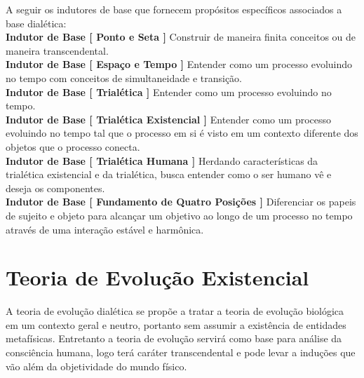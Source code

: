 \documentclass[10pt,a4paper]{report}
\begin{document}
A seguir os indutores de base que fornecem propósitos específicos associados a base dialética:\\

\textbf{Indutor de Base [ Ponto e Seta ]} Construir de maneira finita conceitos ou de maneira transcendental. \\

\textbf{Indutor de Base [ Espaço e Tempo ]} Entender como um processo evoluindo no tempo com conceitos de simultaneidade e transição.\\

\textbf{Indutor de Base [ Trialética ]} Entender como um processo evoluindo no tempo.\\

\textbf{Indutor de Base [ Trialética Existencial ]} Entender como um processo evoluindo no tempo tal que o processo em si é visto em um contexto diferente dos objetos que o processo conecta.\\

\textbf{Indutor de Base [ Trialética Humana ]} Herdando características da trialética existencial e da trialética, busca entender como o ser humano vê e deseja os componentes.\\

\textbf{Indutor de Base [ Fundamento de Quatro Posições ]} Diferenciar os papeis de sujeito e objeto para alcançar um objetivo ao longo de um processo no tempo através de uma interação estável e harmônica.



\section{Teoria de Evolução Existencial}

\hspace{\baselineskip}

A teoria de evolução dialética se propõe a tratar a teoria de evolução biológica em um contexto geral e neutro, portanto sem assumir a existência de entidades metafísicas. Entretanto a teoria de evolução servirá como base para análise da consciência humana, logo terá caráter transcendental e pode levar a induções que vão além da objetividade do mundo físico. 
\end{document}
